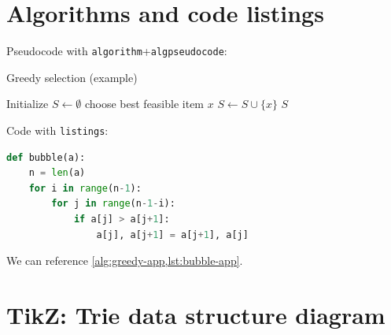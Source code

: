 \section{Algorithms and code listings}
Pseudocode with \texttt{algorithm}+\texttt{algpseudocode}:
\begin{algorithm}[h]
\caption{Greedy selection (example)}
\begin{algorithmic}[1]
  \State Initialize $S \gets \emptyset$
    \State choose best feasible item $x$
    \State $S \gets S \cup \{x\}$
  \EndWhile
  \State \Return $S$
\end{algorithmic}
\label{alg:greedy-app}
\end{algorithm}

Code with \texttt{listings}:
{\captionsetup{type=lstlisting}
\begin{lstlisting}[language=Python,caption={Bubble sort},label={lst:bubble-app}]
def bubble(a):
    n = len(a)
    for i in range(n-1):
        for j in range(n-1-i):
            if a[j] > a[j+1]:
                a[j], a[j+1] = a[j+1], a[j]
\end{lstlisting}
}



We can reference \cref{alg:greedy-app,lst:bubble-app}.


\par\noindent
\section{TikZ: Trie data structure diagram}

